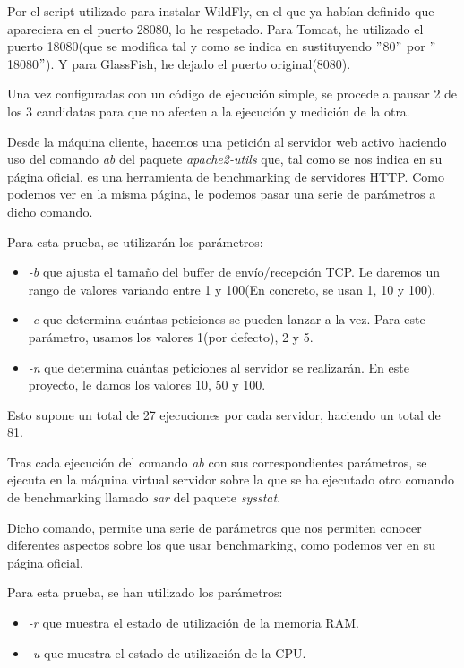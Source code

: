 \documentclass[a4paper, 10pt]{article}
\begin{document}
	Por el script utilizado para instalar WildFly, en el que ya habían definido que apareciera en el
	puerto 28080, lo he respetado. Para Tomcat, he utilizado el puerto 18080(que se modifica tal y como se
	indica en \cite{TC_StackOverFlow} sustituyendo $"$80$"$ por $"$18080$"$). Y para GlassFish, he dejado
	el puerto original(8080).

	Una vez configuradas con un código de ejecución	simple, se procede a pausar 2 de los 3 candidatas
	para que no afecten a la ejecución y medición de la otra.
	
	Desde la máquina cliente, hacemos una petición al servidor web activo haciendo uso del comando
	\textit{ab} del paquete \textit{apache2-utils} que, tal como se nos indica en su página
	oficial\cite{AB_official}, es una herramienta de benchmarking de servidores HTTP. Como podemos
	 ver en la misma página, le podemos pasar una serie de parámetros a dicho comando.
	
	Para esta prueba, se utilizarán los parámetros:
	\begin{itemize}
		\item \textit{-b} que ajusta el tamaño del buffer de envío/recepción TCP. Le daremos un rango
		de valores variando entre 1 y 100(En concreto, se usan 1, 10 y 100).
		\item \textit{-c} que determina cuántas peticiones se pueden lanzar a la vez. Para este parámetro,
		usamos los valores 1(por defecto), 2 y 5.
		\item \textit{-n} que determina cuántas peticiones al servidor se realizarán. En este proyecto,
		le damos los valores 10, 50 y 100.
	\end{itemize}
	
	Esto supone un total de 27 ejecuciones por cada servidor, haciendo un total de 81.
	
	Tras cada ejecución del comando \textit{ab} con sus correspondientes parámetros, se ejecuta
	en la máquina virtual servidor sobre la que se ha ejecutado otro comando de benchmarking llamado
	\textit{sar} del paquete \textit{sysstat}.
	
	Dicho comando, permite una serie de parámetros que nos permiten conocer diferentes aspectos sobre
	los que usar benchmarking, como podemos ver en su página oficial\cite{SAR_official}.
	
	Para esta prueba, se han utilizado los parámetros:
	\begin{itemize}
		\item \textit{-r} que muestra el estado de utilización de la memoria RAM.
		\item \textit{-u} que muestra el estado de utilización de la CPU.
	\end{itemize}
	
\end{document}
